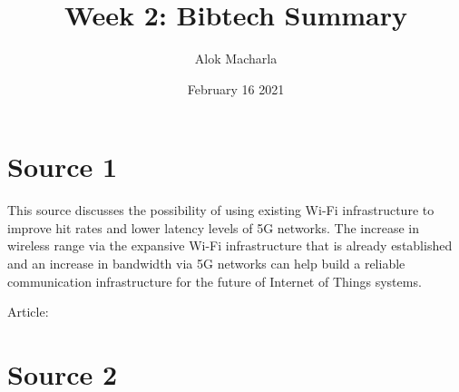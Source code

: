\documentclass{article}
\title{Week 2: Bibtech Summary}
\author{Alok Macharla }
\date{February 16 2021}
\begin{document}
\maketitle

\section{Source 1}
This source discusses the possibility of using existing Wi-Fi infrastructure to improve hit rates and lower latency levels of 5G networks. The increase in wireless range via the expansive Wi-Fi infrastructure that is already established and an increase in bandwidth via 5G networks can help build a reliable communication infrastructure for the future of Internet of Things systems. 

Article: \cite{12632354020171101}

\section{Source 2}



\end{document}
